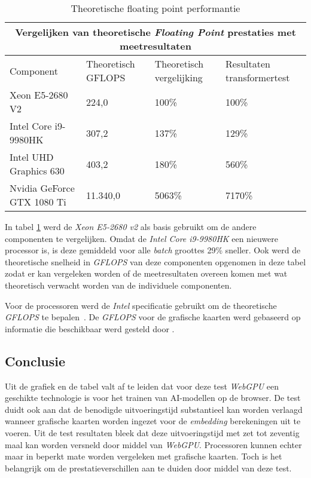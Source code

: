 \begin{table}[t]
    \begin{tabular}{ |p{5.5cm}|p{2.5cm}|p{2.5cm}|p{3.5cm}|  }
        \hline
        \multicolumn{4}{|c|}{Vergelijken van theoretische \textit{Floating Point} prestaties met meetresultaten} \\
        \hline
        Component& Theoretisch GFLOPS & Theoretisch vergelijking & Resultaten transformertest\\
        \hline
            Xeon E5-2680 V2             & 224,0     & 100\%  & 100\%       \\
            Intel Core i9-9980HK        & 307,2     & 137\%  & 129\%    \\
            Intel UHD Graphics 630      & 403,2     & 180\%  & 560\%    \\
            Nvidia GeForce GTX 1080 Ti  & 11.340,0  & 5063\% & 7170\%   \\
        \hline
    \end{tabular}
    \caption[\textit{Floating point} performantie \textit{CPU's} en \textit{GPU's} \autocite{Intel2024, Intel2024a, TechPowerUp2017, TechPowerUp2017a}]{Theoretische floating point performantie \autocite{Intel2024, Intel2024a, TechPowerUp2017, TechPowerUp2017a}}
    \label{tab:TheoreticalVersusMeasuredPerf}
\end{table}

In tabel \ref{tab:TheoreticalVersusMeasuredPerf} werd de \textit{Xeon E5-2680 v2} als basis gebruikt om de andere componenten te vergelijken. Omdat de \textit{Intel Core i9-9980HK} een nieuwere processor is, is deze gemiddeld voor alle \textit{batch} groottes 29\% sneller. Ook werd de theoretische snelheid in \textit{GFLOPS} van deze componenten opgenomen in deze tabel zodat er kan vergeleken worden of de meetresultaten overeen komen met wat theoretisch verwacht worden van de individuele componenten. 

\bigbreak{}

Voor de processoren werd de \textit{Intel} specificatie gebruikt om de theoretische \textit{GFLOPS} te bepalen~\autocite{Intel2024, Intel2024a}. De \textit{GFLOPS} voor de grafische kaarten werd gebaseerd op informatie die beschikbaar werd gesteld door \textcite{TechPowerUp2017, TechPowerUp2017a}.

\subsection{Conclusie}

Uit de grafiek en de tabel valt af te leiden dat voor deze test \textit{WebGPU} een geschikte technologie is voor het trainen van AI-modellen op de browser. De test duidt ook aan dat de benodigde uitvoeringstijd substantieel kan worden verlaagd wanneer grafische kaarten worden ingezet voor de \textit{embedding} berekeningen uit te voeren. Uit de test resultaten bleek dat deze uitvoeringstijd met zet tot zeventig maal kan worden versneld door middel van \textit{WebGPU}. Processoren kunnen echter maar in beperkt mate worden vergeleken met grafische kaarten. Toch is het belangrijk om de prestatieverschillen aan te duiden door middel van deze test. 


